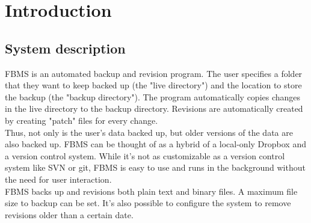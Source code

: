 \documentclass[12pt,a4paper]{article}
\begin{document}
\tableofcontents
\setcounter{tocdepth}{3}
\clearpage

\pagestyle{fancy}
\fancyhf{} %
\renewcommand{\headrulewidth}{0pt} %

\section{Introduction}

\subsection{System description}
FBMS is an automated backup and revision program. The user specifies a folder that they want to keep backed up (the "live directory") and the location to store the backup (the "backup directory"). The program automatically copies changes in the live directory to the backup directory. Revisions are automatically created by creating "patch" files for every change. \\

Thus, not only is the user's data backed up, but older versions of the data are also backed up. FBMS can be thought of as a hybrid of a local-only Dropbox\cite{dropbox} and a version control system. While it's not as customizable as a version control system like SVN\cite{svn} or git\cite{git}, FBMS is easy to use and runs in the background without the need for user interaction. \\

FBMS backs up and revisions both plain text and binary files. A maximum file size to backup can be set. It's also possible to configure the system to remove revisions older than a certain date.
\end{document}
